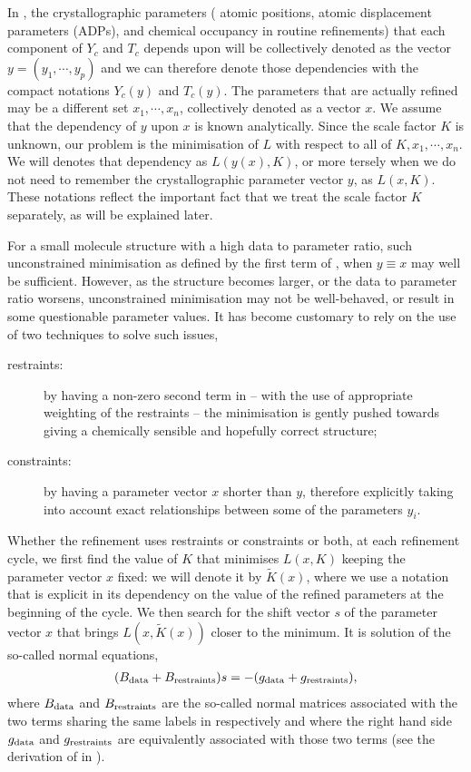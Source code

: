 \documentclass[11pt]{article}
\begin{document}
In , the crystallographic parameters ( atomic positions, atomic displacement parameters (ADPs), and chemical occupancy in routine refinements) that each component of $Y_c$ and $T_c$ depends upon will be collectively denoted as the vector $y=(y_1, \cdots, y_p)$ and we can therefore denote those dependencies with the compact notations $Y_c(y)$ and $T_c(y)$. The parameters that are actually refined may be a different set $x_1, \cdots, x_n$, collectively denoted as a vector $x$. We assume that the dependency of $y$ upon $x$ is known analytically. Since the scale factor $K$ is unknown, our problem is the minimisation of $L$ with respect to all of $K, x_1, \cdots, x_n$. We will  denotes that dependency as $L(y(x), K)$, or more tersely when we do not need to remember the crystallographic parameter vector $y$, as $L(x, K)$. These notations reflect the important fact that we treat the scale factor $K$ separately, as will be explained later.

For a small molecule structure with a high data to parameter ratio, such unconstrained minimisation as defined by the first term of , when $y \equiv x$ may well be sufficient. However, as the structure becomes larger, or the data to parameter ratio worsens, unconstrained minimisation may not be well-behaved, or result in some questionable parameter values. It has become customary to rely on the use of two techniques to solve such issues,
\begin{description}
\item[restraints:] by having a non-zero second term in  -- with the use of appropriate weighting of the restraints -- the minimisation is gently pushed towards giving a chemically sensible and hopefully correct structure;
\item[constraints:] by having a parameter vector $x$ shorter than $y$, therefore explicitly taking into account exact relationships between some of the parameters $y_i$.
\end{description}

Whether the refinement uses restraints or constraints or both, at each refinement cycle, we first find the value of $K$ that minimises $L(x, K)$ keeping the parameter vector $x$ fixed: we will denote it by $\tilde{K}(x)$, where we use a notation that is explicit in its dependency on the value of the refined parameters at the beginning of the cycle. We then search for the shift vector $s$ of the parameter vector $x$ that brings $L(x, \tilde{K}(x))$ closer to the minimum. It is solution of the so-called normal equations,
\begin{align}
(B_{\text{data}} + B_{\text{restraints}})s = -(g_{\text{data}} + g_{\text{restraints}}),
\label{eqn:generalnormalequations}
\end{align}
where $B_{\text{data}}$ and $B_{\text{restraints}}$ are the so-called normal matrices associated with the two terms sharing the same labels in  respectively and where the right hand side $g_{\text{data}}$ and $g_{\text{restraints}}$ are equivalently associated with those two terms (see the derivation of  in ).
\end{document}
